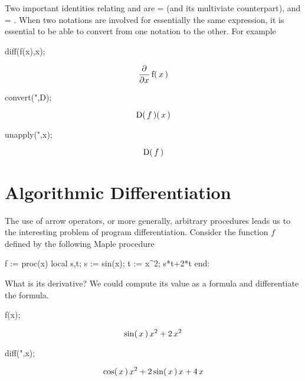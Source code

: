 \documentclass[11pt,dvips]{mtn}
\begin{document}
Two important identities relating  and
 are  =  (and its
multiviate counterpart), and  = .
When two notations are involved for essentially the same
expression, it is essential to be able to convert from
one notation to the other.  For example

\begin{mapleinput}
diff(f(x),x);
\end{mapleinput}
\begin{maplelatex}
\[
{\frac {{ \partial}}{{ \partial}{x}}}\,{\rm f}(\,{x}\,)
\]
\end{maplelatex}
\begin{mapleinput}
convert(",D);
\end{mapleinput}
\begin{maplettyout}
\end{maplettyout}
\begin{maplelatex}
\[
{\rm D}(\,{f}\,)(\,{x}\,)
\]
\end{maplelatex}
\begin{mapleinput}
unapply(",x);
\end{mapleinput}
\begin{maplettyout}
\end{maplettyout}
\begin{maplelatex}
\[
{\rm D}(\,{f}\,)
\]
\end{maplelatex}

\section{Algorithmic Differentiation}

The use of arrow operators, or more generally, arbitrary procedures
leads us to the interesting problem of program differentiation.
Consider the function $f$ defined by the following Maple procedure

\begin{mapleinput}
f := proc(x) local s,t; s := sin(x); t := x^2; s*t+2*t end:
\end{mapleinput}

\vspace{1mm}
What is its derivative?
We could compute its value as a formula and differentiate
the formula.

\begin{mapleinput}
f(x);
\end{mapleinput}
\begin{maplelatex}
\[
{\rm sin}(\,{x}\,)\,{x}^{2} + 2\,{x}^{2}
\]
\end{maplelatex}
\begin{mapleinput}
diff(",x);
\end{mapleinput}
\begin{maplelatex}
\[
{\rm cos}(\,{x}\,)\,{x}^{2} + 2\,{\rm sin}(\,{x}\,)\,{x} + 4\,{x}
\]
\end{maplelatex}
\end{document}
